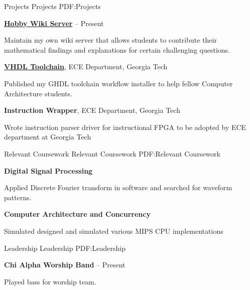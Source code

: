 \documentclass[letterpaper,MMMyyyy,nonstopmode]{simpleresumecv}
\begin{document}
\begin{Body}

\Section
{Projects}
{Projects}
{PDF:Projects}

\Entry
\href{https://yehowshuaimmanuel.com}
{\textbf{Hobby Wiki Server}}
\hfill
{} --
Present
\begin{Detail}
\BulletItem
Maintain my own wiki server that allows students to contribute their mathematical findings and explanations for
certain challenging questions.
\end{Detail}
\Gap

\Entry
\href{https://github.com/BracketMaster/quick-ghdl-toolchain}
{\textbf{VHDL Toolchain}},
ECE Department, Georgia Tech
\hfill
{}
\begin{Detail}
\BulletItem
Published my GHDL toolchain workflow installer to help fellow Computer Architecture students.
\end{Detail}
\Gap

\Entry
{\textbf{Instruction Wrapper}},
ECE Department, Georgia Tech
\hfill
{}
\begin{Detail}
\BulletItem
Wrote instruction parser driver for instructional FPGA to be adopted by ECE department at Georgia Tech
\end{Detail}


\Section
{Relevant Coursework}
{Relevant Coursework}
{PDF:Relevant Coursework}

\Entry
{\textbf{Digital Signal Processing}}
\begin{Detail}
\BulletItem
Applied Discrete Fourier transform in software and searched for
waveform patterns.
\end{Detail}

\Entry
{\textbf{Computer Architecture and Concurrency}}
\begin{Detail}
\BulletItem
Simulated designed and simulated various MIPS CPU implementations
\end{Detail}
\Gap


\Section
{Leadership}
{Leadership}
{PDF:Leadership}

\Entry
{\textbf{Chi Alpha  Worship Band}}
\hfill
{} --
Present
\begin{Detail}
\BulletItem
Played bass for worship team.
\end{Detail}
\Gap


\end{Body}
\end{document}
